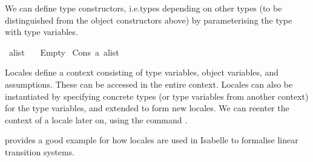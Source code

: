 \begin{isabellebody}
%
\begin{isamarkuptext}%
We can define type constructors, i.e.\@ types depending on other types (to be distinguished from the object constructors above) by parameterising the type with type variables.%
\end{isamarkuptext}\isamarkuptrue%
\isamarkupfalse%
\ {\isacharparenleft}{\kern0pt}{\isacharprime}{\kern0pt}a{\isacharparenright}{\kern0pt}list\ {\isacharequal}{\kern0pt}\isanewline
\ \ Empty\isanewline
{\isacharbar}{\kern0pt}\ Cons\ {\isacartoucheopen}{\isacharprime}{\kern0pt}a{\isacartoucheclose}\ {\isacartoucheopen}{\isacharparenleft}{\kern0pt}{\isacharprime}{\kern0pt}a{\isacharparenright}{\kern0pt}list{\isacartoucheclose}\isanewline
%
%
\isadelimdocument
%
\endisadelimdocument
%
\isatagdocument
%
\isamarkuptrue%
%
\endisatagdocument
{\isafolddocument}%
%
\isadelimdocument
%
\endisadelimdocument
%
\begin{isamarkuptext}%
Locales define a context consisting of type variables, object variables, and assumptions. These can be accessed in the entire context. Locales can also be instantiated by specifying concrete types (or type variables from another context) for the type variables, and extended to form new locales. We can reenter the context of a locale later on, using the command .

 provides a good example for how locales are used in Isabelle to formalise linear transition systems.%
\end{isamarkuptext}\isamarkuptrue%
%
\isadelimtheory
%
\endisadelimtheory
%
\isatagtheory
%
\endisatagtheory
{\isafoldtheory}%
%
\isadelimtheory
%
\endisadelimtheory
%
\end{isabellebody}%
\endinput
